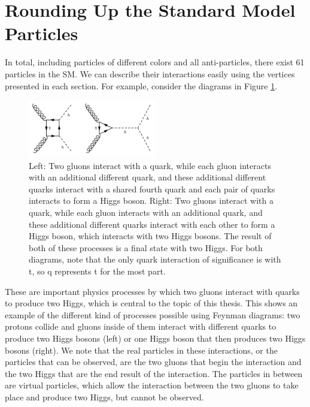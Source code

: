 \section{Rounding Up the Standard Model Particles}
In total, including particles of different colors and all anti-particles, there exist 61 particles in the SM. We can describe their interactions easily using the vertices presented in each section. For example, consider the diagrams in Figure \ref{Fig:Intro:hh}.
\begin{figure}[h]
    \centering
        \includegraphics[width=0.5\textwidth]{F1/dihiggs}
        \caption{Left: Two gluons interact with a quark, while each gluon interacts with an additional different quark, and these additional different quarks interact with a shared fourth quark and each pair of quarks interacts to form a Higgs boson. Right: Two gluons interact with a quark, while each gluon interacts with an additional quark, and these additional different quarks interact with each other to form a Higgs boson, which interacts with two Higgs bosons. The result of both of these processes is a final state with two Higgs. For both diagrams, note that the only quark interaction of significance is with t, so q represents t for the most part.}
        \label{Fig:Intro:hh}
\end{figure}
These are important physics processes by which two gluons interact with quarks to produce two Higgs, which is central to the topic of this thesis. This shows an example of the different kind of processes possible using Feynman diagrams: two protons collide and gluons inside of them interact with different quarks to produce two Higgs bosons (left) or one Higgs boson that then produces two Higgs bosons (right). We note that the real particles in these interactions, or the particles that can be observed, are the two gluons that begin the interaction and the two Higgs that are the end result of the interaction. The particles in between are virtual particles, which allow the interaction between the two gluons to take place and produce two Higgs, but cannot be observed.



